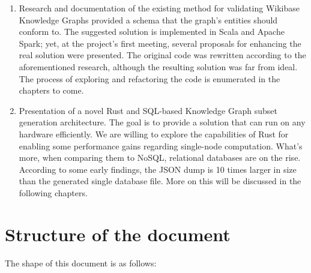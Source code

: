 \begin{enumerate}
    \itemsep0.5em
    \item Research and documentation of the existing method for validating Wikibase Knowledge Graphs provided a schema that the graph's entities should conform to. The suggested solution is implemented in Scala and Apache Spark; yet, at the project's first meeting, several proposals for enhancing the real solution were presented. The original code was rewritten according to the aforementioned research, although the resulting solution was far from ideal. The process of exploring and refactoring the code is enumerated in the chapters to come.
    \item Presentation of a novel Rust and SQL-based Knowledge Graph subset generation architecture. The goal is to provide a solution that can run on any hardware efficiently. We are willing to explore the capabilities of Rust for enabling some performance gains regarding single-node computation. What's more, when comparing them to NoSQL, relational databases are on the rise. According to some early findings, the JSON dump is 10 times larger in size than the generated single database file. More on this will be discussed in the following chapters.
\end{enumerate}

\section{Structure of the document}

The shape of this document is as follows:

